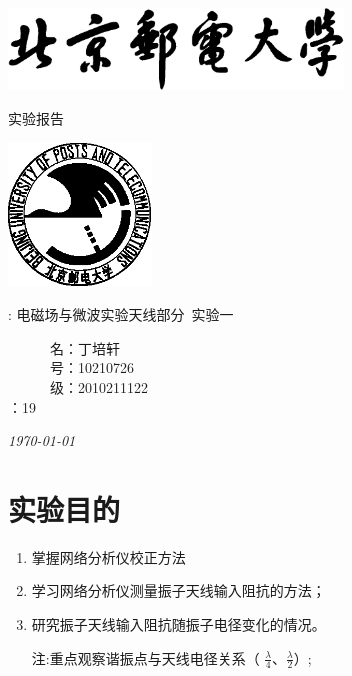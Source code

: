 \documentclass[12pt]{article}
\newcommand{\bigsize}{\fontsize{25pt}{20pt}\selectfont}
\begin{document}
\pagestyle{plain}
\begin{titlepage}
    \center
    \includegraphics[width=3.5in]{images/buptname.eps}

    \begin{spacing}{5}
        {\bigsize 实验报告}
    \end{spacing}

    \includegraphics[width=1.5in]{images/buptseal.eps}

    \begin{spacing}{1}
        \vspace{3cm}
        : 电磁场与微波实验天线部分~实验一
        \vspace{3cm}
    \end{spacing}

    \begin{minipage}{0.23\linewidth}
        ~~~~~~名：丁培轩 \\
        ~~~~~~号：10210726\\
        ~~~~~~级：2010211122\\
        ：19\\
    \end{minipage}

    {\small\em \today }
\end{titlepage}

\tableofcontents

\newpage

\section{实验目的}

\begin{enumerate}
    \item 掌握网络分析仪校正方法

    \item 学习网络分析仪测量振子天线输入阻抗的方法；
    \item 研究振子天线输入阻抗随振子电径变化的情况。

        注:重点观察谐振点与天线电径关系（ $\frac{\lambda}{4}$、$\frac{\lambda}{2}$）;

\end{enumerate}
\end{document}
